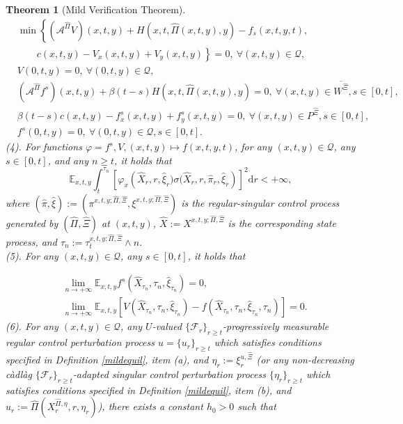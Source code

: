 \documentclass[11pt,reqno]{article}%
\newtheorem{theorem}{Theorem}[section]
\numberwithin{equation}{section}
\begin{document}
\begin{theorem}[Mild Verification Theorem]
\begin{subequations}
\begin{align}
&\min\left\{\left(\mathcal{A}^{\hat{\Pi}}V\right)(x,t,y)+H\left(x,t,\hat{\Pi}(x,t,y),y\right)-f_s(x,t,y,t),\right.\nonumber\\
&\left.\quad \quad c(x,t,y)-V_{x}(x,t,y)+V_{y}(x,t,y)\right\}=0,\ \forall (x,t,y)\in\mathcal{Q}, \label{mildv}\\
&V(0,t,y)=0,\ \forall(0,t,y)\in\mathcal{Q},\label{mildvT}\\
&\left(\mathcal{A}^{\hat{\Pi}}f^{s}\right)(x,t,y)+\beta(t-s)H\left(x,t,\hat\Pi(x,t,y),y\right)=0,\ \forall (x,t,y)\in \overline{W^{\hat{\Xi}}}, s\in[0,t],\label{mildfw}\\
& \beta(t-s)c(x,t,y)-f^{s}_{x}(x,t,y)+f^{s}_{y}(x,t,y)=0,\ \forall (x,t,y)\in P^{\hat{\Xi}}, s\in[0,t],\label{mildfp}\\
&f^{s}(0,t,y)=0,\ \forall (0,t,y)\in\mathcal{Q}, s\in[0,t].\label{mildfT}
\end{align}
\end{subequations}
(4). For functions $\varphi=f^{s},V,(x,t,y)\mapsto f(x,t,y,t)$, for any $(x,t,y)\in\mathcal{Q}$, any  $s\in[0,t]$, and any $n\geq t$, it holds that 
\begin{equation}
\mathbb{E}_{x,t,y}\int_{t}^{\tau_n}\left[\varphi_{x}\left(\hat{X}_{r},r,\hat\xi_{r})\sigma(\hat{X}_{r},r,\hat\pi_r,\hat\xi_{r}\right)\right]^{2}\mathrm{d}r<+\infty,
\nonumber\end{equation}
where $\left(\hat{\pi},\hat{\xi}\right):=\left(\pi^{x,t,y;\hat{\Pi},\hat{\Xi}},\xi^{x,t,y;\hat{\Pi},\hat{\Xi}}\right)$ is the regular-singular control process generated by $\left(\hat{\Pi},\hat{\Xi}\right)$ at $(x,t,y)$, $\hat{X}:=X^{x,t,y;\hat{\Pi},\hat{\Xi}}$ is the corresponding state process, and $\tau_{n}:=\tau^{x,t,y;\hat{\Pi},\hat{\Xi}}_{t}\wedge n$.\\
(5). For any $(x,t,y)\in\mathcal{Q}$, any $s\in[0,t]$, it holds that 

\begin{align}
&\lim\limits_{n\rightarrow+\infty}\mathbb{E}_{x,t,y}f^{s}\left(\hat{X}_{\tau_{n}},\tau_{n},\hat{\xi}_{\tau_{n}}\right)=0,\nonumber\\
&\lim\limits_{n\rightarrow+\infty}\mathbb{E}_{x,t,y}\left[V\left(\hat{X}_{\tau_{n}},\tau_{n},\hat{\xi}_{\tau_{n}}\right)-f\left(\hat{X}_{\tau_{n}},\tau_{n},\hat{\xi}_{\tau_{n}},\tau_{n}\right)\right]=0.\nonumber
\end{align}
(6). For any $(x,t,y)\in\mathcal{Q}$, any $U$-valued $\{\mathcal{F}_{r}\}_{r\ge t}$-progressively measurable regular control perturbation process $u=\{u_{r}\}_{r\ge t}$ which satisfies conditions specified in Definition \ref{mildequil}, item (a), and $\eta_{r}:=\xi^{u,\hat{\Xi}}_{r}$ (or any non-decreasing c\`{a}dl\`{a}g $\{\mathcal{F}_{r}\}_{r\ge t}$-adapted singular control perturbation process $\{\eta_{r}\}_{r\ge t}$ which satisfies conditions specified in Definition \ref{mildequil}, item (b), and $u_{r}:=\hat{\Pi}(X^{\hat{\Pi},\eta}_{r},r,\eta_{r})$), there exists a constant $h_0>0$ such that 


\end{theorem}
\end{document}
